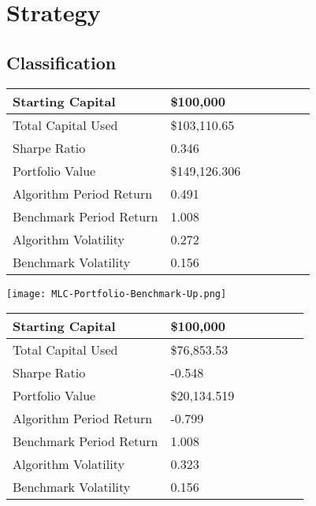 \section{Strategy}

\subsection{Classification}

\begin{center}
    \begin{tabular}{ | l | l | l | | l | l | l | p{5cm} |}
    \hline
    
    Starting Capital & \$100,000 \\ \hline
    Total Capital Used & \$103,110.65 \\ \hline
    Sharpe Ratio & 0.346 \\ \hline
    Portfolio Value & \$149,126.306 \\ \hline
    Algorithm Period Return & 0.491 \\ \hline
    Benchmark Period Return & 1.008 \\ \hline
    Algorithm Volatility & 0.272 \\ \hline
    Benchmark Volatility & 0.156 \\
    \hline
    \end{tabular}
    \label{table:nonfloat}
\end{center}

\begin{center}  
    \texttt{[image: MLC-Portfolio-Benchmark-Up.png]}
    \label{fig:nonfloat}
\end{center}

\begin{center}
    \begin{tabular}{ | l | l | l | | l | l | l | p{5cm} |}
    \hline
    Starting Capital & \$100,000 \\ \hline
    Total Capital Used & \$76,853.53 \\ \hline
    Sharpe Ratio & -0.548 \\ \hline
    Portfolio Value & \$20,134.519 \\ \hline
    Algorithm Period Return & -0.799 \\ \hline
    Benchmark Period Return & 1.008 \\ \hline
    Algorithm Volatility & 0.323 \\ \hline
    Benchmark Volatility & 0.156 \\
    \hline
    \end{tabular}
    \label{table:nonfloat}
\end{center}

